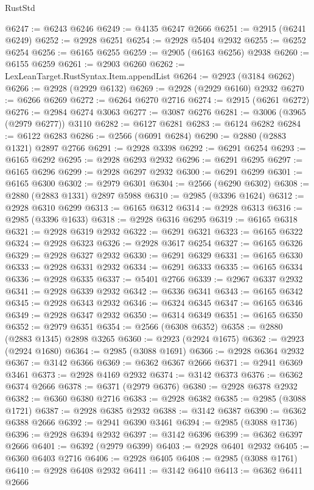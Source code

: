 \begin{lexlean}{RustStd}
\begin{coremodule}
@6247 := @6243 @6246
@6249 := @4135 @6247 @2666
@6251 := @2915 (@6241 @6249)
@6252 := @2928 @6251
@6254 := @2928 @5404 @2932
@6255 := @6252 @6254
@6256 := @6165 @6255
@6259 := @2905 (@6163 @6256) @2938
@6260 := @6155 @6259
@6261 := @2903 @6260
@6262 := LexLeanTarget.RustSyntax.Item.appendList
@6264 := @2923 (@3184 @6262)
@6266 := @2928 (@2929 @6132)
@6269 := @2928 (@2929 @6160) @2932
@6270 := @6266 @6269
@6272 := @6264 @6270 @2716
@6274 := @2915 (@6261 @6272)
@6276 := @2984 @6274 @3063
@6277 := @3087 @6276
@6281 := @3006 (@3965 (@2979 @6277)) @3110
@6282 := @6127 @6281
@6283 := @6124 @6282
@6284 := @6122 @6283
@6286 := @2566 (@6091 @6284)
@6290 := @2880 (@2883 @1321) @2897 @2766
@6291 := @2928 @3398
@6292 := @6291 @6254
@6293 := @6165 @6292
@6295 := @2928 @6293 @2932
@6296 := @6291 @6295
@6297 := @6165 @6296
@6299 := @2928 @6297 @2932
@6300 := @6291 @6299
@6301 := @6165 @6300
@6302 := @2979 @6301
@6304 := @2566 (@6290 @6302)
@6308 := @2880 (@2883 @1331) @2897 @5988
@6310 := @2985 (@3396 @1624)
@6312 := @2928 @6310 @6299
@6313 := @6165 @6312
@6314 := @2928 @6313
@6316 := @2985 (@3396 @1633)
@6318 := @2928 @6316 @6295
@6319 := @6165 @6318
@6321 := @2928 @6319 @2932
@6322 := @6291 @6321
@6323 := @6165 @6322
@6324 := @2928 @6323
@6326 := @2928 @3617 @6254
@6327 := @6165 @6326
@6329 := @2928 @6327 @2932
@6330 := @6291 @6329
@6331 := @6165 @6330
@6333 := @2928 @6331 @2932
@6334 := @6291 @6333
@6335 := @6165 @6334
@6336 := @2928 @6335
@6337 := @5401 @2766
@6339 := @2967 @6337 @2932
@6341 := @2928 @6339 @2932
@6342 := @6336 @6341
@6343 := @6165 @6342
@6345 := @2928 @6343 @2932
@6346 := @6324 @6345
@6347 := @6165 @6346
@6349 := @2928 @6347 @2932
@6350 := @6314 @6349
@6351 := @6165 @6350
@6352 := @2979 @6351
@6354 := @2566 (@6308 @6352)
@6358 := @2880 (@2883 @1345) @2898 @3265
@6360 := @2923 (@2924 @1675)
@6362 := @2923 (@2924 @1680)
@6364 := @2985 (@3088 @1691)
@6366 := @2928 @6364 @2932
@6367 := @3142 @6366
@6369 := @6362 @6367 @2666
@6371 := @2941 @6369 @3461
@6373 := @2928 @4169 @2932
@6374 := @3142 @6373
@6376 := @6362 @6374 @2666
@6378 := @6371 (@2979 @6376)
@6380 := @2928 @6378 @2932
@6382 := @6360 @6380 @2716
@6383 := @2928 @6382
@6385 := @2985 (@3088 @1721)
@6387 := @2928 @6385 @2932
@6388 := @3142 @6387
@6390 := @6362 @6388 @2666
@6392 := @2941 @6390 @3461
@6394 := @2985 (@3088 @1736)
@6396 := @2928 @6394 @2932
@6397 := @3142 @6396
@6399 := @6362 @6397 @2666
@6401 := @6392 (@2979 @6399)
@6403 := @2928 @6401 @2932
@6405 := @6360 @6403 @2716
@6406 := @2928 @6405
@6408 := @2985 (@3088 @1761)
@6410 := @2928 @6408 @2932
@6411 := @3142 @6410
@6413 := @6362 @6411 @2666

\end{coremodule}
\end{lexlean}

